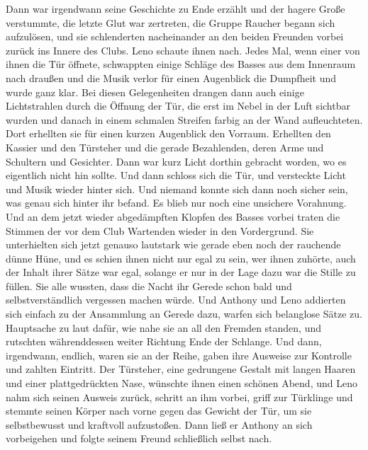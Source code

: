 \documentclass[ngerman,smalldemyvopaper,11pt,oneside,onecolumn,openright,extrafontsizes]{memoir}
\begin{document}
Dann war irgendwann seine Geschichte zu Ende erzählt und der hagere Große verstummte, die letzte Glut war zertreten, die Gruppe Raucher begann sich aufzulösen, und sie schlenderten nacheinander an den beiden Freunden vorbei zurück ins Innere des Clubs. Leno schaute ihnen nach. Jedes Mal, wenn einer von ihnen die Tür öffnete, schwappten einige Schläge des Basses aus dem Innenraum nach draußen und die Musik verlor für einen Augenblick die Dumpfheit und wurde ganz klar. Bei diesen Gelegenheiten drangen dann auch einige Lichtstrahlen durch die Öffnung der Tür, die erst im Nebel in der Luft sichtbar wurden und danach in einem schmalen Streifen farbig an der Wand aufleuchteten. Dort erhellten sie für einen kurzen Augenblick den Vorraum. Erhellten den Kassier und den Türsteher und die gerade Bezahlenden, deren Arme und Schultern und Gesichter. Dann war kurz Licht dorthin gebracht worden, wo es eigentlich nicht hin sollte. Und dann schloss sich die Tür, und versteckte Licht und Musik wieder hinter sich. Und niemand konnte sich dann noch sicher sein, was genau sich hinter ihr befand. Es blieb nur noch eine unsichere Vorahnung. Und an dem jetzt wieder abgedämpften Klopfen des Basses vorbei traten die Stimmen der vor dem Club Wartenden wieder in den Vordergrund. Sie unterhielten sich jetzt genauso lautstark wie gerade eben noch der rauchende dünne Hüne, und es schien ihnen nicht nur egal zu sein, wer ihnen zuhörte, auch der Inhalt ihrer Sätze war egal, solange er nur in der Lage dazu war die Stille zu füllen. Sie alle wussten, dass die Nacht ihr Gerede schon bald und selbstverständlich vergessen machen würde. Und Anthony und Leno addierten sich einfach zu der Ansammlung an Gerede dazu, warfen sich belanglose Sätze zu. Hauptsache zu laut dafür, wie nahe sie an all den Fremden standen, und rutschten währenddessen weiter Richtung Ende der Schlange. Und dann, irgendwann, endlich, waren sie an der Reihe, gaben ihre Ausweise zur Kontrolle und zahlten Eintritt. Der Türsteher, eine gedrungene Gestalt mit langen Haaren und einer plattgedrückten Nase, wünschte ihnen einen schönen Abend, und Leno nahm sich seinen Ausweis zurück, schritt an ihm vorbei, griff zur Türklinge und stemmte seinen Körper nach vorne gegen das Gewicht der Tür, um sie selbstbewusst und kraftvoll aufzustoßen. Dann ließ er Anthony an sich vorbeigehen und folgte seinem Freund schließlich selbst nach.
\vspace{0.5em} \\
\end{document}
